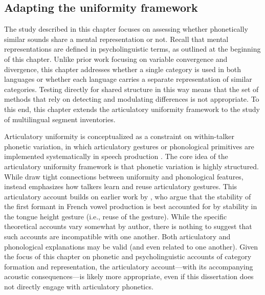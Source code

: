\subsection{Adapting the uniformity framework}\label{ch4:sec:uniformity}

The study described in this chapter focuses on assessing whether phonetically similar sounds share a mental representation or not. Recall that mental representations are defined in psycholinguistic terms, as outlined at the beginning of this chapter. Unlike prior work focusing on variable convergence and divergence, this chapter addresses whether a single category is used in both languages or whether each language carries a separate representation of similar categories. Testing directly for shared structure in this way means that the set of methods that rely on detecting and modulating differences is not appropriate. To this end, this chapter extends the articulatory uniformity framework to the study of multilingual segment inventories. 

Articulatory uniformity is conceptualized as a constraint on within-talker phonetic variation, in which articulatory gestures or phonological primitives are implemented systematically in speech production \citep{chodroff_2017_structure, faytak_2018_uniformity, menard_2008_invariance}. The core idea of the articulatory uniformity framework is that phonetic variation is highly structured. While \citet{chodroff_2017_structure} draw tight connections between uniformity and phonological features, \citet{faytak_2018_uniformity} instead emphasizes how talkers learn and reuse articulatory gestures. This articulatory account builds on earlier work by \citet{menard_2008_invariance}, who argue that the stability of the first formant in French vowel production is best accounted for by stability in the tongue height gesture (i.e., reuse of the gesture). While the specific theoretical accounts vary somewhat by author, there is nothing to suggest that such accounts are incompatible with one another. Both articulatory and phonological explanations may be valid (and even related to one another). Given the focus of this chapter on phonetic and psycholinguistic accounts of category formation and representation, the articulatory account---with its accompanying acoustic consequences---is likely more appropriate, even if this dissertation does not directly engage with articulatory phonetics. 

